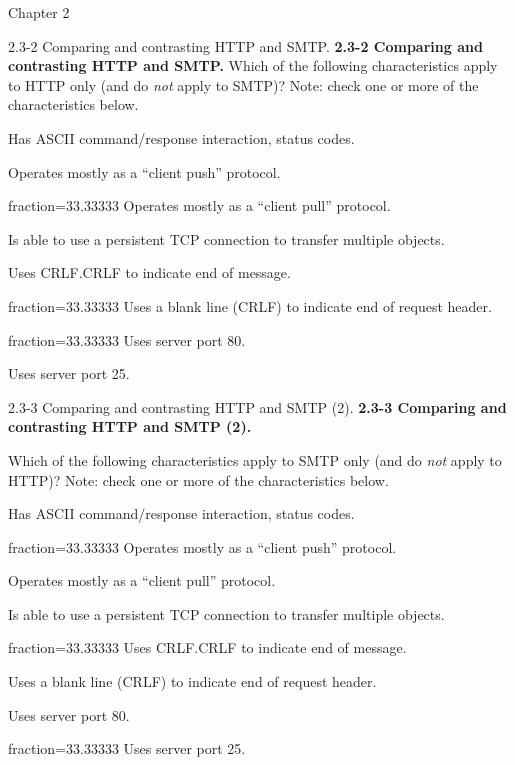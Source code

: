 \documentclass[a4paper]{article}
\begin{document}
\begin{quiz}{Chapter 2}
\begin{multi}[points=1,shuffle,multiple]{2.3-2 Comparing and contrasting HTTP and SMTP.}
\textbf{2.3-2 Comparing and contrasting HTTP and SMTP.} 
Which of the following characteristics apply to HTTP only (and do \emph{not} apply to SMTP)?  
Note: check one or more of the characteristics below.

\item Has ASCII command/response interaction, status codes.
\item Operates mostly as a ``client push'' protocol.
\item[fraction=33.33333] Operates mostly as a ``client pull'' protocol.
\item Is able to use a persistent TCP connection to transfer multiple objects.
\item Uses CRLF.CRLF to indicate end of message.
\item[fraction=33.33333] Uses a blank line (CRLF) to indicate end of request header.
\item[fraction=33.33333] Uses server port 80.
\item Uses server port 25.
\end{multi}

\begin{multi}[points=1,shuffle,multiple]{2.3-3 Comparing and contrasting HTTP and SMTP (2).}
\textbf{2.3-3 Comparing and contrasting HTTP and SMTP (2).} 

Which of the following characteristics apply to SMTP only (and do \emph{not} apply to HTTP)?  
Note: check one or more of the characteristics below.
\item Has ASCII command/response interaction, status codes.
\item[fraction=33.33333] Operates mostly as a ``client push'' protocol.
\item Operates mostly as a ``client pull'' protocol.
\item Is able to use a persistent TCP connection to transfer multiple objects.
\item[fraction=33.33333] Uses CRLF.CRLF to indicate end of message.
\item Uses a blank line (CRLF) to indicate end of request header.
\item Uses server port 80.
\item[fraction=33.33333] Uses server port 25.
\end{multi}


\end{quiz}
\end{document}
